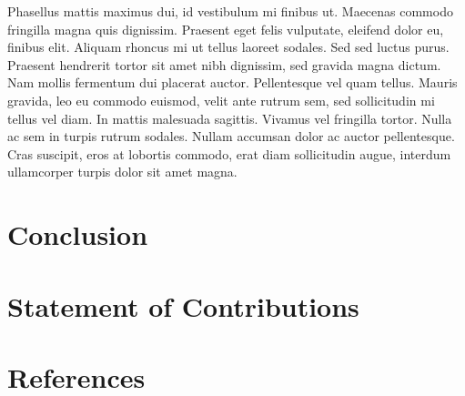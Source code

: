 \documentclass[conference]{IEEEtran}
\begin{document}
Phasellus mattis maximus dui, id vestibulum mi finibus ut. Maecenas commodo fringilla magna quis dignissim. Praesent eget felis vulputate, eleifend dolor eu, finibus elit. Aliquam rhoncus mi ut tellus laoreet sodales. Sed sed luctus purus. Praesent hendrerit tortor sit amet nibh dignissim, sed gravida magna dictum. Nam mollis fermentum dui placerat auctor. Pellentesque vel quam tellus. Mauris gravida, leo eu commodo euismod, velit ante rutrum sem, sed sollicitudin mi tellus vel diam. In mattis malesuada sagittis. Vivamus vel fringilla tortor. Nulla ac sem in turpis rutrum sodales. Nullam accumsan dolor ac auctor pellentesque. Cras suscipit, eros at lobortis commodo, erat diam sollicitudin augue, interdum ullamcorper turpis dolor sit amet magna. 

\section{Conclusion}

\section{Statement of Contributions}

\section{References}
\end{document}
